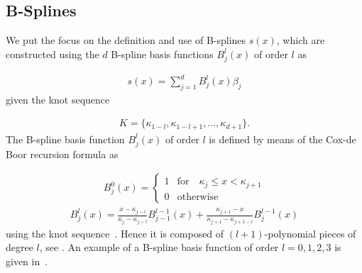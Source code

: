 \subsection{B-Splines} \label{subsec:b-splines}

We put the focus on the definition and use of B-splines $s(x)$, which are constructed using the $d$ B-spline basis functions $B_j^l(x)$ of order $l$ as

\begin{align}
	s(x) = \sum_{j=1}^d B_j^l(x) \beta_j 
\end{align}
%
given the knot sequence 

\begin{align} \label{eq:knot-sequence}
	K = \{\kappa_{1-l}, \kappa_{1-l+1}, \dots, \kappa_{d+1}\}.
\end{align}
%
The B-spline basis function $B_j^l(x)$ of order $l$ is defined by means of the Cox-de Boor recursion formula as

\begin{align} \label{eq:Bspline_recDef1}
	B_j^0(x) = \begin{cases} 1 & \text{for} \quad \kappa_j \le x < \kappa_{j+1} \\ 
					 		 0 & \text{otherwise} 
	\end{cases}
\end{align}
\begin{align} \label{eq:Bspline_recDef2}
	B_j^l(x) = \frac{x - \kappa_{j-l}}{\kappa_{j} - \kappa_{j-l}} B_{j-1}^{l-1}(x) + \frac{\kappa_{j+1} - x}{\kappa_{j+1} - \kappa_{j+1-l}} B_{j}^{l-1}(x)
\end{align}
%
using the knot sequence~. Hence it is composed of $(l+1)$-polynomial pieces of degree $l$, see \cite{fahrmeir2007regression}. An example of a B-spline basis function of order $l=0, 1, 2, 3$ is given in~. 

